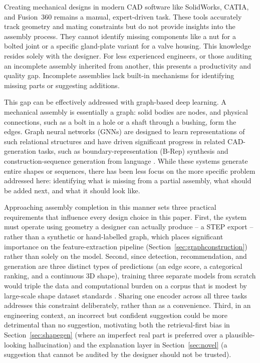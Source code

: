 \documentclass[sn-mathphys,Numbered]{sn-jnl}
\begin{document}
Creating mechanical designs in modern CAD software like SolidWorks, CATIA, and Fusion~360 remains a manual, expert-driven task. These tools accurately track geometry and mating constraints but do not provide insights into the assembly process. They cannot identify missing components like a nut for a bolted joint or a specific gland-plate variant for a valve housing. This knowledge resides solely with the designer. For less experienced engineers, or those auditing an incomplete assembly inherited from another, this presents a productivity and quality gap. Incomplete assemblies lack built-in mechanisms for identifying missing parts or suggesting additions.

This gap can be effectively addressed with graph-based deep learning. A mechanical assembly is essentially a graph: solid bodies are nodes, and physical connections, such as a bolt in a hole or a shaft through a bushing, form the edges. Graph neural networks (GNNs) are designed to learn representations of such relational structures and have driven significant progress in related CAD-generation tasks, such as boundary-representation (B-Rep) synthesis \cite{brepgen2024,solidgen2024} and construction-sequence generation from language \cite{cadgpt2025}. While these systems generate entire shapes or sequences, there has been less focus on the more specific problem addressed here: identifying what is missing from a partial assembly, what should be added next, and what it should look like.

Approaching assembly completion in this manner sets three practical requirements that influence every design choice in this paper. First, the system must operate using geometry a designer can actually produce -- a STEP export -- rather than a synthetic or hand-labelled graph, which places significant importance on the feature-extraction pipeline (Section~\ref{sec:graphconstruction}) rather than solely on the model. Second, since detection, recommendation, and generation are three distinct types of predictions (an edge score, a categorical ranking, and a continuous 3D shape), training three separate models from scratch would triple the data and computational burden on a corpus that is modest by large-scale shape dataset standards \cite{koch2019abc,mo2019partnet}. Sharing one encoder across all three tasks addresses this constraint deliberately, rather than as a convenience. Third, in an engineering context, an incorrect but confident suggestion could be more detrimental than no suggestion, motivating both the retrieval-first bias in Section~\ref{sec:shapegen} (where an imperfect real part is preferred over a plausible-looking hallucination) and the explanation layer in Section~\ref{sec:novel} (a suggestion that cannot be audited by the designer should not be trusted).
\end{document}

